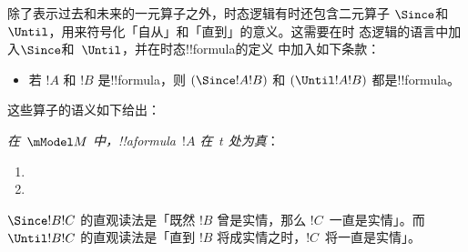 \documentclass[../../../include/open-logic-section]{subfiles}
\begin{document}


除了表示过去和未来的一元算子之外，时态逻辑有时还包含二元算子
$\Since $和~$\Until$，用来符号化「自从」和「直到」的意义。这需要在时
态逻辑的语言中加入$\Since $和~$\Until$，并在时态!!{formula}的定义
中加入如下条款：

\begin{itemize}
\item[] 若 $!A$ 和 $!B$ 是!!{formula}，则 $(\Since  !A !B)$ 和
  $(\Until !A !B)$ 都是!!{formula}。
\end{itemize}

这些算子的语义如下给出：

\begin{defn}
  \emph{在~$\mModel M$ 中，!!a{formula}~$!A$ 在~$t$ 处为真}：
  \begin{enumerate}
  \item{} 
   \item{} 
  \end{enumerate}
\end{defn}

$\Since  !B !C$ 的直观读法是「既然 $!B$ 曾是实情，那么 $!C$~一直是实情」。而
$\Until !B !C$ 的直观读法是「直到 $!B$ 将成实情之时，$!C$~将一直是实情」。
\end{document}
